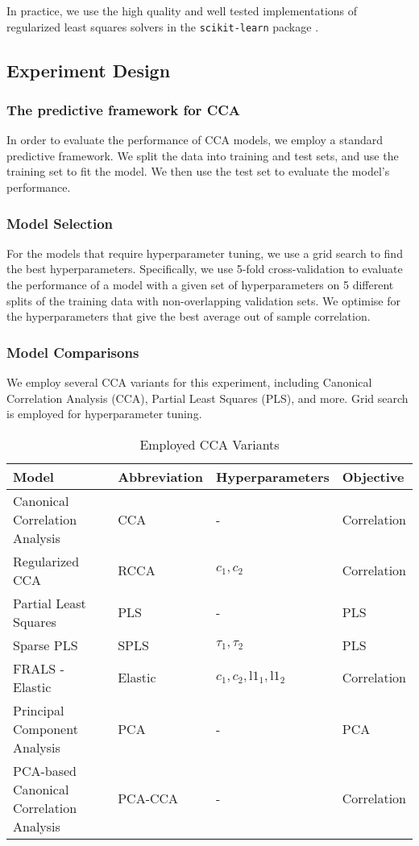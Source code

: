 In practice, we use the high quality and well tested implementations of regularized least squares solvers in the \texttt{scikit-learn} package \cite{pedregosa2011scikit}.

\subsection{Experiment Design}

\subsubsection{The predictive framework for CCA}

In order to evaluate the performance of CCA models, we employ a standard predictive framework.
We split the data into training and test sets, and use the training set to fit the model.
We then use the test set to evaluate the model's performance.

\subsubsection{Model Selection}

For the models that require hyperparameter tuning, we use a grid search to find the best hyperparameters.
Specifically, we use 5-fold cross-validation to evaluate the performance of a model with a given set of
hyperparameters on 5 different splits of the training data with non-overlapping validation sets. We optimise for the
hyperparameters that give the best average out of sample correlation.

\subsubsection{Model Comparisons}
We employ several CCA variants for this experiment, including Canonical Correlation Analysis (CCA), Partial Least Squares (PLS), and more.
Grid search is employed for hyperparameter tuning.

\begin{table}[h]
\centering
\caption{Employed CCA Variants}
\begin{tabular}{|l|l|l|l|}
\hline
\textbf{Model} & \textbf{Abbreviation} & \textbf{Hyperparameters} & \textbf{Objective} \\
\hline
Canonical Correlation Analysis & CCA & - & Correlation \\
\hline
Regularized CCA & RCCA & \(c_1, c_2\) & Correlation \\
\hline
Partial Least Squares & PLS & - & PLS \\
\hline
Sparse PLS & SPLS & \(\tau_1, \tau_2\) & PLS \\
\hline
FRALS - Elastic & Elastic & \(c_1, c_2, \text{l1}_1, \text{l1}_2\) & Correlation \\
\hline
Principal Component Analysis & PCA & - & PCA \\
\hline
PCA-based Canonical Correlation Analysis & PCA-CCA & - & Correlation \\
\hline
\end{tabular}
\label{table:cca-variants}
\end{table}


